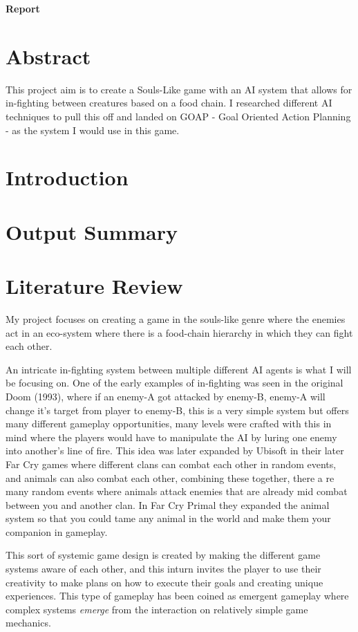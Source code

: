 \documentclass[10pt]{report}
\begin{document}
\begin{titlepage}
\center
{\huge\bfseries Report}  
\end{titlepage}

\tableofcontents

\chapter{Abstract}
This project aim is to create a Souls-Like game with an AI system that allows for in-fighting between creatures based on a food chain. I researched different AI techniques to pull this off and landed on GOAP - Goal Oriented Action Planning - as the system I would use in this game.
\chapter{Introduction}
\chapter{Output Summary}
\chapter{Literature Review}
My project focuses on creating a game in the souls-like genre where the enemies act in an eco-system where there is a food-chain hierarchy in which they can fight each other.

An intricate in-fighting system between multiple different AI agents is what I will be focusing on. One of the early examples of in-fighting was seen in the original Doom (1993)\cite{doom93}, where if an enemy-A got attacked by enemy-B, enemy-A will change it's target from player to enemy-B, this is a very simple system but offers many different gameplay opportunities, many levels were crafted with this in mind where the players would have to manipulate the AI by luring one enemy into another's line of fire.
This idea was later expanded by Ubisoft in their later Far Cry games where different clans can combat each other in random events, and animals can also combat each other, combining these together, there a re many random events where animals attack enemies that are already mid combat between you and another clan. In Far Cry Primal they expanded the animal system so that you could tame any animal in the world and make them your companion in gameplay.

This sort of systemic game design is created by making the different game systems aware of each other, and this inturn invites the player to use their creativity to make plans on how to execute their goals and creating unique experiences. This type of gameplay has been coined as emergent gameplay where complex systems \textit{emerge} from the interaction on relatively simple game mechanics.\cite{emergentGameplay}
\end{document}
